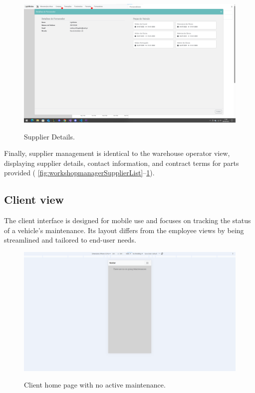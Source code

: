 \begin{figure}[h]
  \caption{Supplier Details.}
  \centering
  \includegraphics[width=\textwidth]{figs/Implementation/workshopmanager/supplierDetails}
  \label{fig:workshopmanagerupplierDetails}
\end{figure}

Finally, supplier management is identical to the warehouse operator view, displaying supplier details, contact information, and contract terms for parts provided ( \ref{fig:workshopmanagerSupplierList}–\ref{fig:workshopmanagerupplierDetails}).



\subsection{Client view}



The client interface is designed for mobile use and focuses on tracking the status of a vehicle's maintenance. Its layout differs from the employee views by being streamlined and tailored to end-user needs.

\begin{figure}[h]
  \caption{Client home page with no active maintenance.}
  \centering
  \includegraphics[width=\textwidth]{figs/Implementation/client/MaintenanceNoState}
  \label{fig:MaintenanceNoState}
\end{figure}



